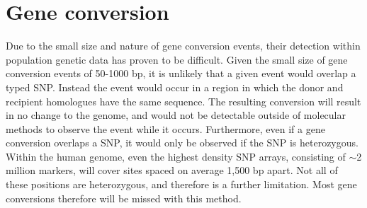 








\section{Gene conversion}






Due to the small size and nature of gene conversion events, their detection within population genetic data has proven to be difficult.
Given the small size of gene conversion events of 50-1000 bp, it is unlikely that a given event would overlap a typed SNP.
Instead the event would occur in a region in which the donor and recipient homologues have the same sequence.
The resulting conversion will result in no change to the genome, and would not be detectable outside of molecular methods to observe the event while it occurs.
Furthermore, even if a gene conversion overlaps a SNP, it would only be observed if the SNP is heterozygous.
Within the human genome, even the highest density SNP arrays, consisting of $\sim$2 million markers, will cover sites spaced on average 1,500 bp apart.
Not all of these positions are heterozygous, and therefore is a further limitation.
Most gene conversions therefore will be missed with this method.

